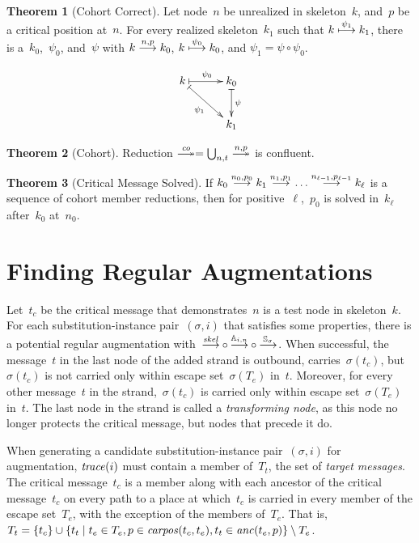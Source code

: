 \documentclass[12pt]{article}
\theoremstyle{definition}
\newtheorem{thm}{Theorem}[section]
\begin{document}
\begin{thm}[Cohort Correct]
Let node~$n$ be unrealized in skeleton~$k$, and~$p$ be a critical
position at~$n$.  For every realized skeleton~$k_1$ such that
$k\stackrel{\psi_1}{\longmapsto}k_1$, there is a~$k_0$,~$\psi_0$, and~$\psi$
with $k\stackrel{n,p}{\longrightarrow}k_0$, $k\stackrel{\psi_0}{\longmapsto}k_0$, and
$\psi_1=\psi\circ\psi_0$.

$$\xymatrix@C=3em{
k\ar@{|->}[r]^{\psi_0} \ar@{|->}[rd]_{\psi_1} &
k_0 \ar@{|->}[d]^{\psi}\\
&k_1}$$
\end{thm}

\begin{thm}[Cohort]
Reduction $\setreduction{\fn{co}}=\bigcup_{n,t}\setreduction{n,p}$ is
confluent.
\end{thm}

\begin{thm}[Critical Message Solved]
If $k_0\stackrel{n_0,p_0}{\longrightarrow}k_1 \stackrel{n_1,p_1}{\longrightarrow}\ldots
\stackrel{n_{\ell-1},p_{\ell-1}}{\longrightarrow}k_\ell$ is a sequence of cohort member
reductions, then for positive~$\ell$,~$p_0$ is solved in~$k_\ell$
after~$k_0$ at~$n_0$.
\end{thm}

\section{Finding Regular Augmentations}\label{augmentations}

Let~$t_c$ be the critical message that demonstrates~$n$ is a test node
in skeleton~$k$.  For each substitution-instance pair~$(\sigma,i)$
that satisfies some properties, there is a potential regular
augmentation with~$\comp{\reduction{\fn{skel}}}%
{\comp{\reduction{\ops{A}_{i,n}}}{\reduction{\ops{S}_\sigma}}}$.
When successful, the message~$t$ in the last node of the added strand
is outbound, carries~$\sigma(t_c)$, but~$\sigma(t_c)$ is not carried
only within escape set~$\sigma(T_e)$ in~$t$.  Moreover, for every
other message~$t$ in the strand,~$\sigma(t_c)$ is carried only within
escape set~$\sigma(T_e)$ in~$t$.  The last node in the strand is
called a \emph{transforming node}, as this node no longer protects the
critical message, but nodes that precede it do.

When generating a candidate substitution-instance pair~$(\sigma,i)$
for augmentation, $\operatorname{\mathit{trace}}(i)$ must contain a member of~$T_t$, the
set of \emph{target messages}.  The critical message~$t_c$ is a member along
with each ancestor of the critical message~$t_c$ on every path to a place
at which~$t_c$ is carried in every member of the escape set~$T_e$,
with the exception of the members of~$T_e$.  That is,
$T_t=\{t_c\}\cup\{t_t\mid t_e\in T_e,p\in\operatorname{\mathit{carpos}}(t_c, t_e),
t_t\in\operatorname{\mathit{anc}}(t_e,p)\}\setminus T_e$.
\end{document}
